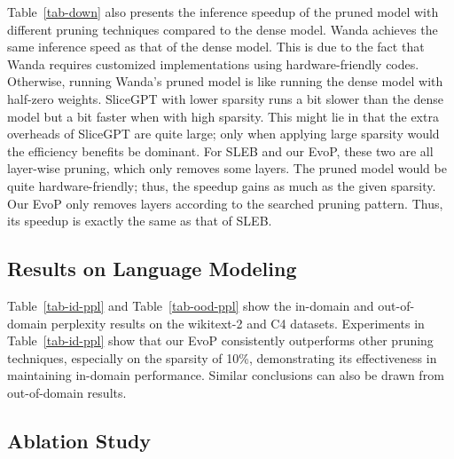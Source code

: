 Table~\ref{tab-down} also presents the inference speedup of the pruned model with different pruning techniques compared to the dense model.
Wanda achieves the same inference speed as that of the dense model.
This is due to the fact that Wanda requires customized implementations using hardware-friendly codes.
Otherwise, running Wanda's pruned model is like running the dense model with half-zero weights.
SliceGPT with lower sparsity runs a bit slower than the dense model but a bit faster when with high sparsity.
This might lie in that the extra overheads of SliceGPT are quite large; only when applying large sparsity would the efficiency benefits be dominant.
For SLEB and our EvoP, these two are all layer-wise pruning, which only removes some layers.
The pruned model would be quite hardware-friendly; thus, the speedup gains as much as the given sparsity.
Our EvoP only removes layers according to the searched pruning pattern. 
Thus, its speedup is exactly the same as that of SLEB.

\subsection{Results on Language Modeling}
Table~\ref{tab-id-ppl} and Table~\ref{tab-ood-ppl} show the in-domain and out-of-domain perplexity results on the wikitext-2 and C4 datasets.
Experiments in Table~\ref{tab-id-ppl} show that our EvoP consistently outperforms other pruning techniques, especially on the sparsity of 10\%, demonstrating its effectiveness in maintaining in-domain performance.
Similar conclusions can also be drawn from out-of-domain results. 


\subsection{Ablation Study}



